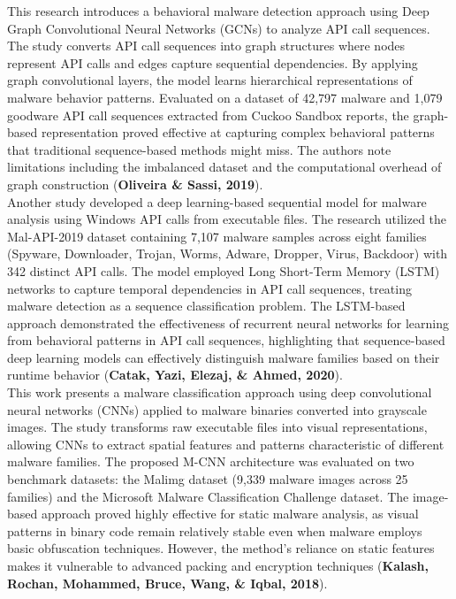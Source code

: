 This research introduces a behavioral malware detection approach using Deep Graph Convolutional Neural Networks (GCNs) to analyze API call sequences. The study converts API call sequences into graph structures where nodes represent API calls and edges capture sequential dependencies. By applying graph convolutional layers, the model learns hierarchical representations of malware behavior patterns. Evaluated on a dataset of 42,797 malware and 1,079 goodware API call sequences extracted from Cuckoo Sandbox reports, the graph-based representation proved effective at capturing complex behavioral patterns that traditional sequence-based methods might miss. The authors note limitations including the imbalanced dataset and the computational overhead of graph construction (\textbf{Oliveira \& Sassi, 2019})\cite{Oliveira2019}.\\

Another study developed a deep learning-based sequential model for malware analysis using Windows API calls from executable files. The research utilized the Mal-API-2019 dataset containing 7,107 malware samples across eight families (Spyware, Downloader, Trojan, Worms, Adware, Dropper, Virus, Backdoor) with 342 distinct API calls. The model employed Long Short-Term Memory (LSTM) networks to capture temporal dependencies in API call sequences, treating malware detection as a sequence classification problem. The LSTM-based approach demonstrated the effectiveness of recurrent neural networks for learning from behavioral patterns in API call sequences, highlighting that sequence-based deep learning models can effectively distinguish malware families based on their runtime behavior (\textbf{Catak, Yazi, Elezaj, \& Ahmed, 2020})\cite{Catak2020}.\\

This work presents a malware classification approach using deep convolutional neural networks (CNNs) applied to malware binaries converted into grayscale images. The study transforms raw executable files into visual representations, allowing CNNs to extract spatial features and patterns characteristic of different malware families. The proposed M-CNN architecture was evaluated on two benchmark datasets: the Malimg dataset (9,339 malware images across 25 families) and the Microsoft Malware Classification Challenge dataset. The image-based approach proved highly effective for static malware analysis, as visual patterns in binary code remain relatively stable even when malware employs basic obfuscation techniques. However, the method's reliance on static features makes it vulnerable to advanced packing and encryption techniques (\textbf{Kalash, Rochan, Mohammed, Bruce, Wang, \& Iqbal, 2018})\cite{Kalash2018}.\\
